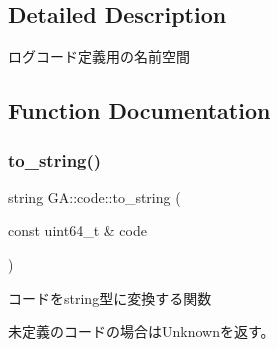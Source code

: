 \subsection{Detailed Description}
ログコード定義用の名前空間 



\subsection{Function Documentation}
\mbox{\label{namespace_g_a_1_1code_abc5de9a375bbfb29df3bfee41dbe8c60}} 
\subsubsection{\texorpdfstring{to\_string()}{to\_string()}}
{\footnotesize\ttfamily string G\+A\+::code\+::to\+\_\+string (\begin{DoxyParamCaption}\item[{const uint64\+\_\+t \&}]{code }\end{DoxyParamCaption})}



コードをstring型に変換する関数 

未定義のコードの場合は\+Unknownを返す。 